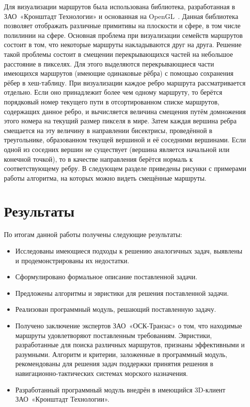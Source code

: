 Для визуализации маршрутов была использована библиотека, разработанная в
ЗАО~«Кронштадт Технологии» и основанная на OpenGL~\cite{opengl}. Данная
библиотека позволяет отображать различные примитивы на плоскости и
сфере, в том числе полилинии на сфере. Основная проблема при
визуализации семейств маршрутов состоит в том, что некоторые маршруты
накладываются друг на друга. Решение такой проблемы состоит в смещении
перекрывающихся частей на небольшое расстояние в пикселях. Для этого
выделяются перекрывающиеся части имеющихся маршрутов (имеющие
одинаковые рёбра) с помощью сохранения рёбер в хеш-таблицу. При
визуализации каждое ребро маршрута рассматривается отдельно. Если оно
принадлежит более чем одному маршруту, то берётся порядковый номер
текущего пути в отсортированном списке маршрутов, содержащих данное
ребро, и вычисляется величина смещения путём домножения этого номера
на текущий размер пикселя в мире. Затем каждая вершина ребра смещается
на эту величину в направлении бисектрисы, проведённой в треугольнике,
образованном текущей вершиной и её соседними вершинами. Если одной из
соседних вершин не существует (вершина является начальной или конечной
точкой), то в качестве направления берётся нормаль к соответствующему
ребру. В следующем разделе приведены рисунки с примерами работы
алгоритма, на которых можно видеть смещённые маршруты.

\FloatBarrier

\section{Результаты}

\label{sec:results}

По итогам данной работы получены следующие результаты:
\begin{itemize}
    \item Исследованы имеющиеся подходы к решению аналогичных задач,
      выявлены и продемонстрированы их недостатки.
    \item Сформулировано формальное описание поставленной задачи.
    \item Предложены алгоритмы и эвристики для решения поставленной
      задачи.
    \item Реализован программный модуль, решающий поставленную задачу.
    \item Получено заключение экспертов ЗАО~«ОСК-Транзас» о том, что
      находимые маршруты удовлетворяют поставленным требованиям.
      Эвристики, разработанные для поиска различных маршрутов,
      признаны эффективными и разумными. Алгоритм и критерии,
      заложенные в программный модуль, рекомендованы для решения задач
      поддержки принятия решения в навигационно-тактических системах
      морского назначения.
    \item Разработанный программный модуль внедрён в имеющийся
      3D-клиент ЗАО~«Кронштадт Технологии».
\end{itemize}

